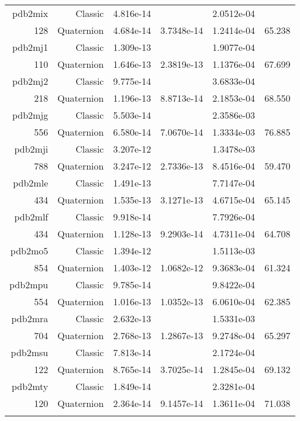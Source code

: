 \begin{xltabular}{\textwidth}{r|rS[table-format=1.3e+2]S[table-format=1.4e+2]S[table-format=1.4e+2]S[table-format=-1.3]}
pdb2mix & Classic & 4.816e-14 &  & 2.0512e-04 & \\
128 & Quaternion & 4.684e-14 & 3.7348e-14 & 1.2414e-04 & 65.238\\  \addlinespace
pdb2mj1 & Classic & 1.309e-13 &  & 1.9077e-04 & \\
110 & Quaternion & 1.646e-13 & 2.3819e-13 & 1.1376e-04 & 67.699\\  \addlinespace
pdb2mj2 & Classic & 9.775e-14 &  & 3.6833e-04 & \\
218 & Quaternion & 1.196e-13 & 8.8713e-14 & 2.1853e-04 & 68.550\\  \addlinespace
pdb2mjg & Classic & 5.503e-14 &  & 2.3586e-03 & \\
556 & Quaternion & 6.580e-14 & 7.0670e-14 & 1.3334e-03 & 76.885\\  \addlinespace
pdb2mji & Classic & 3.207e-12 &  & 1.3478e-03 & \\
788 & Quaternion & 3.247e-12 & 2.7336e-13 & 8.4516e-04 & 59.470\\  \addlinespace
pdb2mle & Classic & 1.491e-13 &  & 7.7147e-04 & \\
434 & Quaternion & 1.535e-13 & 3.1271e-13 & 4.6715e-04 & 65.145\\  \addlinespace
pdb2mlf & Classic & 9.918e-14 &  & 7.7926e-04 & \\
434 & Quaternion & 1.128e-13 & 9.2903e-14 & 4.7311e-04 & 64.708\\  \addlinespace
pdb2mo5 & Classic & 1.394e-12 &  & 1.5113e-03 & \\
854 & Quaternion & 1.403e-12 & 1.0682e-12 & 9.3683e-04 & 61.324\\  \addlinespace
pdb2mpu & Classic & 9.785e-14 &  & 9.8422e-04 & \\
554 & Quaternion & 1.016e-13 & 1.0352e-13 & 6.0610e-04 & 62.385\\  \addlinespace
pdb2mra & Classic & 2.632e-13 &  & 1.5331e-03 & \\
704 & Quaternion & 2.768e-13 & 1.2867e-13 & 9.2748e-04 & 65.297\\  \addlinespace
pdb2msu & Classic & 7.813e-14 &  & 2.1724e-04 & \\
122 & Quaternion & 8.765e-14 & 3.7025e-14 & 1.2845e-04 & 69.132\\  \addlinespace
pdb2mty & Classic & 1.849e-14 &  & 2.3281e-04 & \\
120 & Quaternion & 2.364e-14 & 9.1457e-14 & 1.3611e-04 & 71.038\\  \addlinespace

\end{xltabular}
